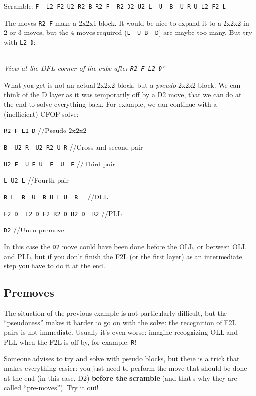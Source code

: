 \documentclass[11pt,a4paper]{book}
\newcommand{\p}{\textquotesingle}
\newcommand{\m}{\texttt}
\newcommand{\ps}{\p\,\,}
\newcommand{\comment}[1]{{\color{gray}\quad//#1}}
\begin{document}
\begin{center}
Scramble: \m{F\ps L2 F2 U2 R2 B R2 F\ps R2 D2 U2 L\ps U\ps B\ps U R U L2 F2 L\p}\\

\end{center}

The moves \m{R2 F} make a 2x2x1 block. It would be nice to expand it to a 2x2x2 in 2 or 3 moves, but the 4 moves required (\m{L\ps U B\ps D}) are maybe too many. But try with \m{L2 D\p}:

\begin{center}
\\
\emph{View at the DFL corner of the cube after \m{R2 F L2 D'}}
\end{center}

What you get is not an actual 2x2x2 block, but a \emph{pseudo} 2x2x2 block. We can think of the D layer as it was temporarily off by a D2 move, that we can do at the end to solve everything back. For example, we can continue with a (inefficient) CFOP solve:

\bigskip
\m{R2 F L2 D\p} \comment{Pseudo 2x2x2}

\m{B\ps U2 R\ps U2 R2 U R} \comment{Cross and second pair}

\m{U2 F\ps U F U\ps F\ps U\ps F} \comment{Third pair}

\m{L U2 L\p} \comment{Fourth pair}

\m{B L\ps B\ps U\ps B U L U\ps B\ps} \comment{OLL}

\m{F2 D\ps L2 D F2 R2 D B2 D\ps R2} \comment{PLL}

\m{D2} \comment{Undo premove}
\bigskip

In this case the \m{D2} move could have been done before the OLL, or between OLL and PLL, but if you don't finish the F2L (or the first layer) as an intermediate step you have to do it at the end.

\subsection{Premoves}

The situation of the previous example is not particularly difficult, but the ``pseudoness'' makes it harder to go on with the solve: the recognition of F2L pairs is not immediate. Usually it's even worse: imagine recognizing OLL and PLL when the F2L is off by, for example, \m R!

Someone advises to try and solve with pseudo blocks, but there is a trick that makes everything easier: you just need to perform the move that should be done at the end (in this case, D2) \textbf{before the scramble} (and that's why they are called ``pre-moves''). Try it out!
\end{document}
